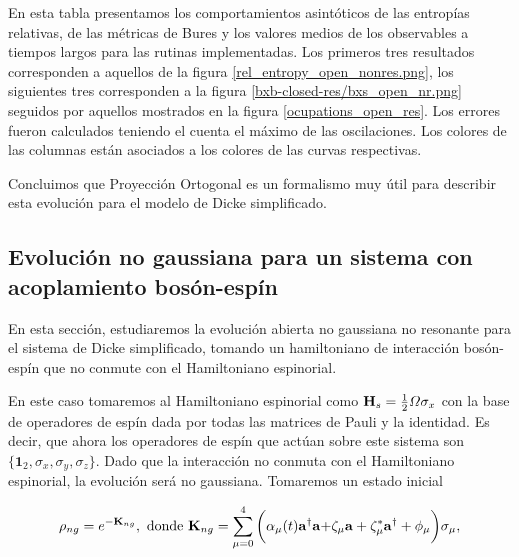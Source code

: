 \documentclass{report} %
\numberwithin{equation}{section}
\begin{document}
\begin{table}
\begin{tabular}{llllll}
        \bottomrule
     \end{tabular} 
    \begin{tablenotes}
      \small
      \item En esta tabla presentamos los comportamientos asintóticos de las entropías relativas, de las métricas de Bures y los valores medios de los observables a tiempos largos para las rutinas implementadas. Los primeros tres resultados corresponden a aquellos de la figura \ref{rel_entropy_open_nonres.png}, los siguientes tres corresponden a la figura \ref{bxb-closed-res/bxs_open_nr.png} seguidos por aquellos mostrados en la figura \ref{ocupations_open_res}. Los errores fueron calculados teniendo el cuenta el máximo de las oscilaciones. Los colores de las columnas están asociados a los colores de las curvas respectivas. 
    \end{tablenotes}
    \label{table4}
\end{table}

Concluimos que Proyección Ortogonal es un formalismo muy útil para describir esta evolución para el modelo de Dicke simplificado. 

\subsection{Evoluci\'on no gaussiana para un sistema con acoplamiento bos\'on-esp\'in}
\label{dicke_non-gaussian}

En esta sección, estudiaremos la evolución abierta no gaussiana no resonante para el sistema de Dicke simplificado, tomando un hamiltoniano de interacción bosón-espín que no conmute con el Hamiltoniano espinorial.

En este caso tomaremos al Hamiltoniano espinorial como ${\bf H}_s = \frac{1}{2}\Omega\sigma_x$ con la base de operadores de espín dada por todas las matrices de Pauli y la identidad. Es decir, que ahora los operadores de espín que actúan sobre este sistema son $\{\mathbf{1}_2, \sigma_x, \sigma_y, \sigma_z\}$. Dado que la interacción no conmuta con el Hamiltoniano espinorial, la evolución será no gaussiana. Tomaremos un estado inicial

\begin{equation}
    \rho_{ng}= e^{-\mathbf{K}_{ng}}, \textnormal { donde } \mathbf{K}_{ng} = \sum_{\mu=0}^{4} \bigg(\alpha_{\mu}(t){\bf a}^{\dagger}{\bf a}{\bf +} \zeta_{\mu}{\bf a} + \zeta_{\mu}^{*}{\bf a}^{\dagger} + \phi_{\mu}\bigg) \sigma_{\mu},
    \label{model3.7_rho}
\end{equation}
\end{document}
